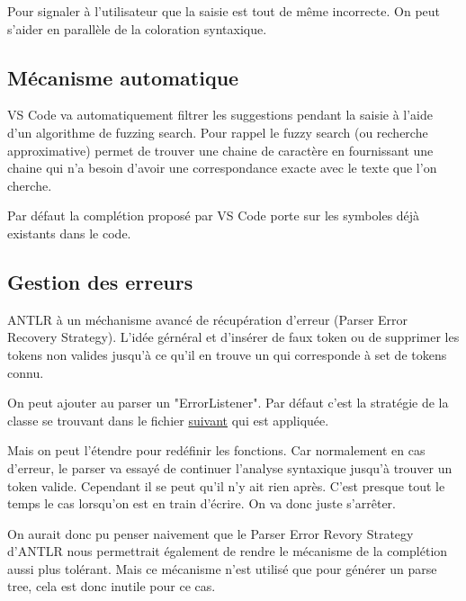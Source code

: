\documentclass[
    iict, %
    il, %
]{heig-tb}
\begin{document}
Pour signaler à l'utilisateur que la saisie est tout de même incorrecte. On peut s'aider en parallèle de la coloration syntaxique.

\subsection{Mécanisme automatique}
VS Code va automatiquement filtrer les suggestions pendant la saisie à l'aide d'un algorithme de fuzzing search.
Pour rappel le fuzzy search (ou recherche approximative) permet de trouver une chaine de caractère en fournissant une chaine qui n'a besoin d'avoir une correspondance exacte
avec le texte que l'on cherche.


Par défaut la complétion proposé par VS Code porte sur les symboles déjà existants dans le code.

\subsection{Gestion des erreurs }\label{error handle} %

ANTLR à un méchanisme avancé de récupération d'erreur (Parser Error Recovery Strategy).
L'idée gérnéral et d'insérer de faux token ou de supprimer les tokens non valides jusqu'à ce qu'il en trouve un qui corresponde à set de tokens connu.


On peut ajouter au parser un "ErrorListener".
Par défaut c'est la stratégie de la classe se trouvant dans le fichier \href{https://github.com/tunnelvisionlabs/antlr4ts/blob/master/src/DefaultErrorStrategy.ts}{suivant} qui est appliquée.

Mais on peut l'étendre pour redéfinir les fonctions.
Car normalement en cas d'erreur, le parser va essayé de continuer l'analyse syntaxique jusqu'à trouver un token valide.
Cependant il se peut qu'il n'y ait rien après. C'est presque tout le temps le cas lorsqu'on est en train d'écrire.
On va donc juste s'arrêter.


On aurait donc pu penser naivement que le Parser Error Revory Strategy d'ANTLR nous permettrait également de rendre le mécanisme de la complétion aussi plus tolérant.
Mais ce mécanisme n'est utilisé que pour générer un parse tree, cela est donc inutile pour ce cas. %
\end{document}
